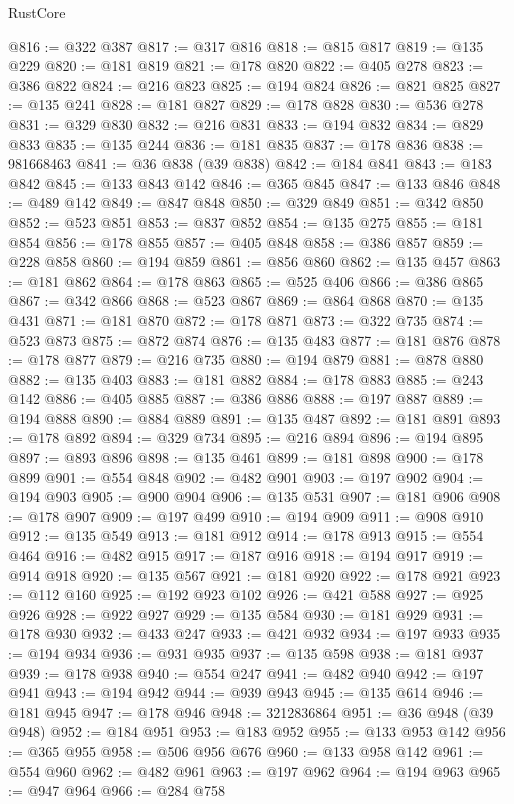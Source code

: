 \begin{lexlean}{RustCore}
\begin{coremodule}
@816 := @322 @387
@817 := @317 @816
@818 := @815 @817
@819 := @135 @229
@820 := @181 @819
@821 := @178 @820
@822 := @405 @278
@823 := @386 @822
@824 := @216 @823
@825 := @194 @824
@826 := @821 @825
@827 := @135 @241
@828 := @181 @827
@829 := @178 @828
@830 := @536 @278
@831 := @329 @830
@832 := @216 @831
@833 := @194 @832
@834 := @829 @833
@835 := @135 @244
@836 := @181 @835
@837 := @178 @836
@838 := 981668463
@841 := @36 @838 (@39 @838)
@842 := @184 @841
@843 := @183 @842
@845 := @133 @843 @142
@846 := @365 @845
@847 := @133 @846
@848 := @489 @142
@849 := @847 @848
@850 := @329 @849
@851 := @342 @850
@852 := @523 @851
@853 := @837 @852
@854 := @135 @275
@855 := @181 @854
@856 := @178 @855
@857 := @405 @848
@858 := @386 @857
@859 := @228 @858
@860 := @194 @859
@861 := @856 @860
@862 := @135 @457
@863 := @181 @862
@864 := @178 @863
@865 := @525 @406
@866 := @386 @865
@867 := @342 @866
@868 := @523 @867
@869 := @864 @868
@870 := @135 @431
@871 := @181 @870
@872 := @178 @871
@873 := @322 @735
@874 := @523 @873
@875 := @872 @874
@876 := @135 @483
@877 := @181 @876
@878 := @178 @877
@879 := @216 @735
@880 := @194 @879
@881 := @878 @880
@882 := @135 @403
@883 := @181 @882
@884 := @178 @883
@885 := @243 @142
@886 := @405 @885
@887 := @386 @886
@888 := @197 @887
@889 := @194 @888
@890 := @884 @889
@891 := @135 @487
@892 := @181 @891
@893 := @178 @892
@894 := @329 @734
@895 := @216 @894
@896 := @194 @895
@897 := @893 @896
@898 := @135 @461
@899 := @181 @898
@900 := @178 @899
@901 := @554 @848
@902 := @482 @901
@903 := @197 @902
@904 := @194 @903
@905 := @900 @904
@906 := @135 @531
@907 := @181 @906
@908 := @178 @907
@909 := @197 @499
@910 := @194 @909
@911 := @908 @910
@912 := @135 @549
@913 := @181 @912
@914 := @178 @913
@915 := @554 @464
@916 := @482 @915
@917 := @187 @916
@918 := @194 @917
@919 := @914 @918
@920 := @135 @567
@921 := @181 @920
@922 := @178 @921
@923 := @112 @160
@925 := @192 @923 @102
@926 := @421 @588
@927 := @925 @926
@928 := @922 @927
@929 := @135 @584
@930 := @181 @929
@931 := @178 @930
@932 := @433 @247
@933 := @421 @932
@934 := @197 @933
@935 := @194 @934
@936 := @931 @935
@937 := @135 @598
@938 := @181 @937
@939 := @178 @938
@940 := @554 @247
@941 := @482 @940
@942 := @197 @941
@943 := @194 @942
@944 := @939 @943
@945 := @135 @614
@946 := @181 @945
@947 := @178 @946
@948 := 3212836864
@951 := @36 @948 (@39 @948)
@952 := @184 @951
@953 := @183 @952
@955 := @133 @953 @142
@956 := @365 @955
@958 := @506 @956 @676
@960 := @133 @958 @142
@961 := @554 @960
@962 := @482 @961
@963 := @197 @962
@964 := @194 @963
@965 := @947 @964
@966 := @284 @758

\end{coremodule}
\end{lexlean}

